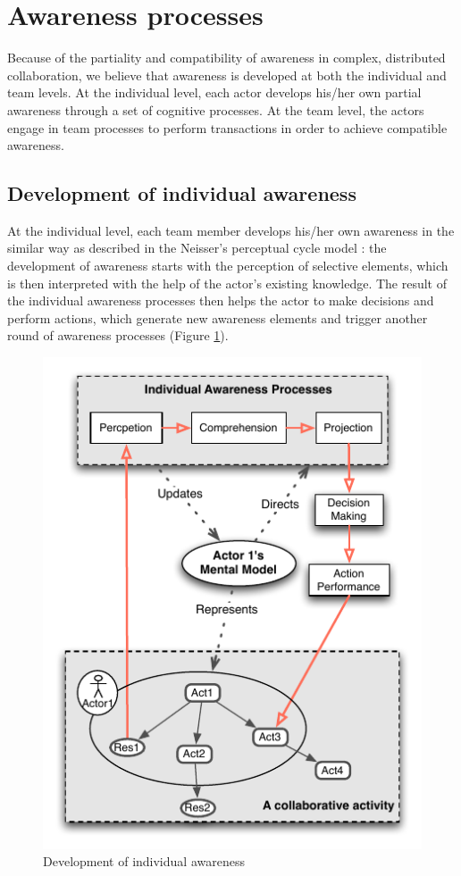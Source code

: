 \section{Awareness processes} %
\label{sec:awareness_processes}
Because of the partiality and compatibility of awareness in complex, distributed collaboration, we believe that awareness is developed at both the individual and team levels. At the individual level, each actor develops his/her own partial awareness through a set of cognitive processes. At the team level, the actors engage in team processes to perform transactions in order to achieve compatible awareness. 

\subsection{Development of individual awareness} %
\label{sub:development_of_individual_awareness}
At the individual level, each team member develops his/her own awareness in the similar way as described in the Neisser's perceptual cycle model \cite{neisser1976cognition}: the development of awareness starts with the perception of selective elements, which is then interpreted with the help of the actor's existing knowledge. The result of the individual awareness processes then helps the actor to make decisions and perform actions, which generate new awareness elements and trigger another round of awareness processes (Figure \ref{fig:individual_processes}). 

\begin{figure}[htbp] %
   \centering
   \includegraphics{individual_processes.pdf} 
   \caption{Development of individual awareness}
   \label{fig:individual_processes}
\end{figure}


